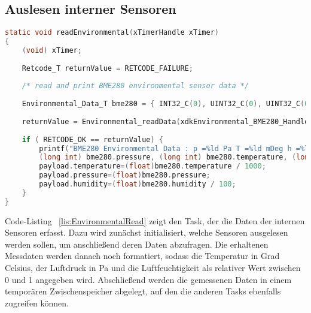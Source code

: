 \subsection{Auslesen interner Sensoren}\label{subsec:Auslesen interner Sensoren}
\begin{lstlisting}[language=C, caption={Read Environmental Data}, label=lis:EnvironmentalRead]
static void readEnvironmental(xTimerHandle xTimer)
{
	(void) xTimer;
	
	Retcode_T returnValue = RETCODE_FAILURE;
	
	/* read and print BME280 environmental sensor data */
	
	Environmental_Data_T bme280 = { INT32_C(0), UINT32_C(0), UINT32_C(0) };
	
	returnValue = Environmental_readData(xdkEnvironmental_BME280_Handle, &bme280);
	
	if ( RETCODE_OK == returnValue) {
		printf("BME280 Environmental Data : p =%ld Pa T =%ld mDeg h =%ld %%rh\n\r",
		(long int) bme280.pressure, (long int) bme280.temperature, (long int) bme280.humidity);
		payload.temperature=(float)bme280.temperature / 1000;
		payload.pressure=(float)bme280.pressure;
		payload.humidity=(float)bme280.humidity / 100;
	}
}
\end{lstlisting}
Code-Listing ~\ref{lis:EnvironmentalRead} zeigt den Task, der die Daten der internen Sensoren erfasst. Dazu wird zunächst initialisiert, welche Sensoren ausgelesen werden sollen, um anschließend deren Daten abzufragen. Die erhaltenen Messdaten werden danach noch formatiert, sodass die Temperatur in Grad Celsius, der Luftdruck in \acf{Pa} und die Luftfeuchtigkeit als relativer Wert zwischen 0 und 1 angegeben wird. Abschließend werden die gemessenen Daten in einem temporären Zwischenspeicher abgelegt, auf den die anderen Tasks ebenfalls zugreifen können.

